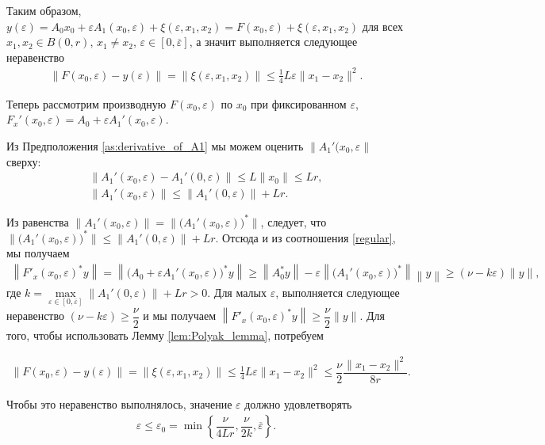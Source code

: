 \documentclass[../main.tex]{subfiles}
\begin{document}
Таким образом, $y(\varepsilon) = A_0x_0 + \varepsilon A_1(x_0,\varepsilon) + \xi(\varepsilon,x_1,x_2) = F(x_0,\varepsilon) + \xi(\varepsilon,x_1,x_2)$ для всех $x_1, x_2 \in B(0,r)$, $x_1 \neq x_2$, $\varepsilon \in [0, \overline{\varepsilon}]$, а значит выполняется следующее неравенство
\begin{gather*}
 \| F(x_0,\varepsilon) - y(\varepsilon) \| = \|\xi(\varepsilon,x_1,x_2)\| \leqslant \frac{1}{4}L\varepsilon\|x_1-x_2\|^2.
\end{gather*}


Теперь рассмотрим производную $F(x_0, \varepsilon)$ по $x_0$ при фиксированном $\varepsilon$, $F_x'(x_0,\varepsilon) = A_0 + \varepsilon A_1'(x_0,\varepsilon) $.

Из Предположения \ref{as:derivative_of_A1} мы можем оценить $\|A_1'(x_0,\varepsilon\|$ сверху:
\begin{gather*}
 \|A_1'(x_0,\varepsilon) - A_1'(0,\varepsilon)\| \leqslant 
 L\|x_0\| \leqslant
 L r, \\
 \|A_1'(x_0,\varepsilon)\| \leqslant \| A_1'(0,\varepsilon)\| + Lr.
\end{gather*}

Из равенства $\|A_1'(x_0,\varepsilon)\| = \|\big(A_1'(x_0,\varepsilon)\big)^*\| $, следует, что $\|\big(A_1'(x_0,\varepsilon)\big)^*\| \leqslant \| A_1'(0,\varepsilon)\| + Lr$.
Отсюда и из соотношения \eqref{regular}, мы получаем 
\begin{gather*}
 \left\|F'_x(x_0, \varepsilon)^* y\right\| = \left\|\big(A_0 + \varepsilon A_1'(x_0, \varepsilon)\big)^* y\right\| \geqslant \left\|A_0^*y \right\| - \varepsilon \left\|\big(A_1'(x_0,\varepsilon)\big)^*\right\| \left\|y\right\| \geqslant (\nu - k\varepsilon)\|y\|,
\end{gather*} где $k = \max\limits_{\varepsilon \in [0,\overline{\varepsilon}]}\| A_1'(0,\varepsilon)\| + Lr > 0$.
Для малых $\varepsilon$, выполняется следующее неравенство $(\nu - k\varepsilon) \geqslant \dfrac{\nu}{2}$ и мы получаем $\left\|F'_x(x_0, \varepsilon)^* y\right\| \geqslant \dfrac{\nu}{2} \|y\|$. 
Для того, чтобы использовать Лемму \ref{lem:Polyak_lemma}, потребуем

\begin{gather*}
 \| F(x_0,\varepsilon) - y(\varepsilon) \| = \|\xi(\varepsilon,x_1,x_2)\| \leqslant \frac{1}{4}L\varepsilon\|x_1-x_2\|^2 \leqslant \dfrac{\nu}{2} \dfrac{\|x_1-x_2\|^2}{8r}.
\end{gather*}

Чтобы это неравенство выполнялось, значение $\varepsilon$ должно удовлетворять 
\begin{gather}
 \varepsilon \leqslant \varepsilon_0 = \min\left\{\dfrac{\nu}{4Lr}, \dfrac{\nu}{2k}, \overline{\varepsilon}\right\}.
\end{gather} 
\end{document}
